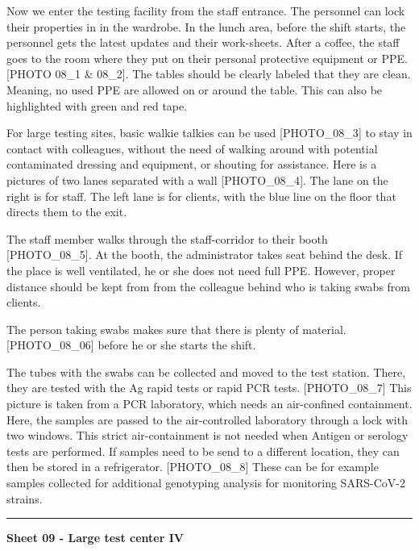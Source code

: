 \documentclass[
]{book}
\begin{document}
Now we enter the testing facility from the staff entrance. The personnel
can lock their properties in in the wardrobe. In the lunch area, before
the shift starts, the personnel gets the latest updates and their
work-sheets. After a coffee, the staff goes to the room where they put
on their personal protective equipment or PPE. {[}PHOTO 08\_1 \& 08\_2{]}.
The tables should be clearly labeled that they are clean. Meaning, no
used PPE are allowed on or around the table. This can also be
highlighted with green and red tape.

For large testing sites, basic walkie talkies can be used {[}PHOTO\_08\_3{]}
to stay in contact with colleagues, without the need of walking around
with potential contaminated dressing and equipment, or shouting for
assistance. Here is a pictures of two lanes separated with a wall
{[}PHOTO\_08\_4{]}. The lane on the right is for staff. The left lane is for
clients, with the blue line on the floor that directs them to the exit.

The staff member walks through the staff-corridor to their booth
{[}PHOTO\_08\_5{]}. At the booth, the administrator takes seat behind the
desk. If the place is well ventilated, he or she does not need full PPE.
However, proper distance should be kept from from the colleague behind
who is taking swabs from clients.

The person taking swabs makes sure that there is plenty of material.
{[}PHOTO\_08\_06{]} before he or she starts the shift.

The tubes with the swabs can be collected and moved to the test station.
There, they are tested with the Ag rapid tests or rapid PCR tests.
{[}PHOTO\_08\_7{]} This picture is taken from a PCR laboratory, which needs
an air-confined containment. Here, the samples are passed to the
air-controlled laboratory through a lock with two windows. This strict
air-containment is not needed when Antigen or serology tests are
performed. If samples need to be send to a different location, they can
then be stored in a refrigerator. {[}PHOTO\_08\_8{]} These can be for
example samples collected for additional genotyping analysis for
monitoring SARS-CoV-2 strains.

\begin{center}\rule{0.5\linewidth}{0.5pt}\end{center}

\textbf{Sheet 09 - Large test center IV}
\end{document}
